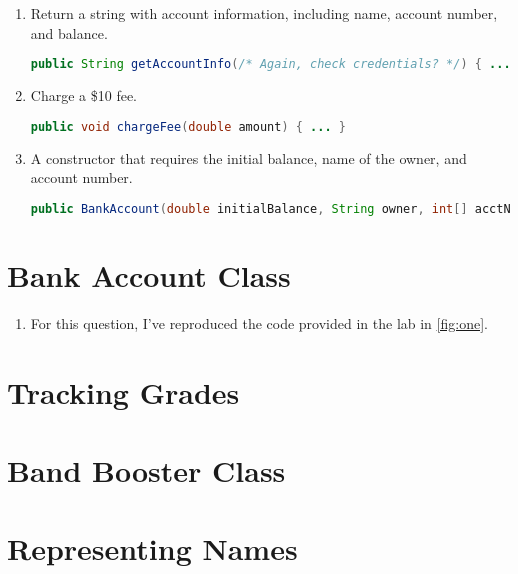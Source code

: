 \documentclass[leqno, 11pt]{article}
\begin{document}
\begin{enumerate}
\begin{enumerate}[label=\alph*.]
\begin{enumerate}[label=\roman*.]
\begin{lstlisting}[language=java, xleftmargin=0.06\textwidth]
                        \end{lstlisting}
                  \item Return a string with account information, including name, account number, and balance.
                        \begin{lstlisting}[language=java, xleftmargin=0.05\textwidth]
public String getAccountInfo(/* Again, check credentials? */) { ... }
                        \end{lstlisting}
                  \item Charge a \$10 fee.
                        \begin{lstlisting}[language=java, xleftmargin=0.18\textwidth]
public void chargeFee(double amount) { ... }
                        \end{lstlisting}
                  \item A constructor that requires the initial balance, name of the owner, and account number.
                        \begin{lstlisting}[language=java, xleftmargin=0.01\textwidth]
public BankAccount(double initialBalance, String owner, int[] acctNumber) { ... }
                        \end{lstlisting}
                \end{enumerate}
        \end{enumerate}
\end{enumerate}
\section{Bank Account Class}
\begin{enumerate}
  \item For this question, I've reproduced the code provided in the lab in \autoref{fig:one}.
\end{enumerate}
\section{Tracking Grades}
\section{Band Booster Class}
\section{Representing Names}
\end{document}
